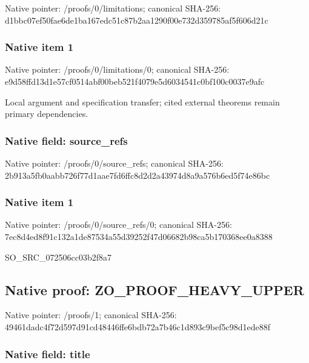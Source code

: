 \documentclass[10pt,a4paper]{article}
\begin{document}
Native pointer: /proofs/0/limitations; canonical SHA-256: d1bbc07ef50fae6de1ba167e\allowbreak{}dc51c87b2aa1290f00e732d3\allowbreak{}59785af5f606d21c



\subsubsection{Native item 1}


Native pointer: /proofs/0/limitations/0; canonical SHA-256: e9d58ffd13d1e57cf0514abf\allowbreak{}00beb521f4079e5d6034541c\allowbreak{}0bf100c0037e9afc


Local argument and specification transfer; cited external theorems remain primary dependencies.


\subsubsection{Native field: source\_refs}


Native pointer: /proofs/0/source\_refs; canonical SHA-256: 2b913a5fb0aabb726f77d1aa\allowbreak{}e7fd6ffc8d2d2a43974d8a9a\allowbreak{}576b6ed5f74e86bc



\subsubsection{Native item 1}


Native pointer: /proofs/0/source\_refs/0; canonical SHA-256: 7ec8d4ed8f91c132a1de8753\allowbreak{}4a55d39252f47d06682b98ca\allowbreak{}5b170368ee0a8388


SO\_SRC\_072506cc03b2f8a7


\subsection{Native proof: ZO\_PROOF\_HEAVY\_UPPER}


Native pointer: /proofs/1; canonical SHA-256: 49461dadc4f72d597d91cd48\allowbreak{}446ffe6bdb72a7b46c1d893c\allowbreak{}9bef5c98d1ede88f



\subsubsection{Native field: title}
\end{document}
